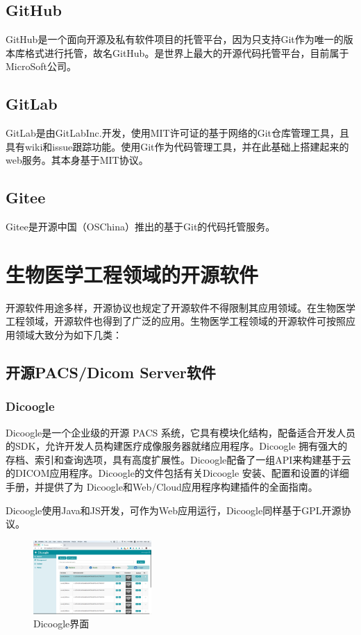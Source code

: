 \documentclass[UTF8]{ctexart}
\begin{document}
\subsection{GitHub}
GitHub是一个面向开源及私有软件项目的托管平台，因为只支持Git作为唯一的版本库格式进行托管，故名GitHub。是世界上最大的开源代码托管平台，目前属于MicroSoft公司。

\subsection{GitLab}
GitLab是由GitLabInc.开发，使用MIT许可证的基于网络的Git仓库管理工具，且具有wiki和issue跟踪功能。使用Git作为代码管理工具，并在此基础上搭建起来的web服务。其本身基于MIT协议。

\subsection{Gitee}
Gitee是开源中国（OSChina）推出的基于Git的代码托管服务。

\section{生物医学工程领域的开源软件}
开源软件用途多样，开源协议也规定了开源软件不得限制其应用领域。在生物医学工程领域，开源软件也得到了广泛的应用。生物医学工程领域的开源软件可按照应用领域大致分为如下几类：
\subsection{开源PACS/Dicom Server软件}
\subsubsection{Dicoogle}
Dicoogle是一个企业级的开源 PACS 系统，它具有模块化结构，配备适合开发人员的SDK，允许开发人员构建医疗成像服务器就绪应用程序\cite{topPACS}。Dicoogle 拥有强大的存档、索引和查询选项，具有高度扩展性。Dicoogle配备了一组API来构建基于云的DICOM应用程序。Dicoogle的文件包括有关Dicoogle 安装、配置和设置的详细手册，并提供了为 Dicoogle和Web/Cloud应用程序构建插件的全面指南。

Dicoogle使用Java和JS开发，可作为Web应用运行，Dicoogle同样基于GPL开源协议。

\begin{figure}[H]
    \centering
    \includegraphics[width=0.4\textwidth]{dicoogle.png}
    \caption{Dicoogle界面}
    \label{fig:Dicoogle}
\end{figure}
\end{document}

